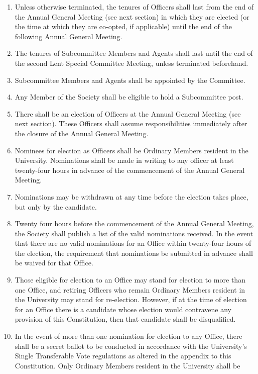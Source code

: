 \documentclass{article}
\begin{document}
\begin{enumerate}
\item Unless otherwise terminated, the tenures of Officers shall last from the
end of the Annual General Meeting (see next section) in which they are
elected (or the time at which they are co-opted, if applicable) until the
end of the following Annual General Meeting.
\item The tenures of Subcommittee Members and Agents shall last until the
end of the second Lent Special Committee Meeting, unless terminated
beforehand.
\item Subcommittee Members and Agents shall be appointed by the Committee.
\item Any Member of the Society shall be eligible to hold a Subcommittee post.
\item There shall be an election of Officers at the Annual General Meeting (see
next section). These Officers shall assume responsibilities immediately
after the closure of the Annual General Meeting.
\item Nominees for election as Officers shall be Ordinary Members resident in
the University. Nominations shall be made in writing to any officer at least twenty-four hours in advance of the commencement of the Annual General Meeting.
\item Nominations may be withdrawn at any time before the election takes
place, but only by the candidate.
\item Twenty four hours before the commencement of the Annual General Meeting, the Society shall publish a list of the valid nominations received. In
the event that there are no valid nominations for an Office within twenty-four hours of the election, the requirement that nominations be submitted
in advance shall be waived for that Office.
\item Those eligible for election to an Office may stand for election to more than
one Office, and retiring Officers who remain Ordinary Members resident in
the University may stand for re-election. However, if at the time of election
for an Office there is a candidate whose election would contravene any
provision of this Constitution, then that candidate shall be disqualified.
\item In the event of more than one nomination for election to any Office, there
shall be a secret ballot to be conducted in accordance with the University's
Single Transferable Vote regulations as altered in the appendix to this
Constitution. Only Ordinary Members resident in the University shall be

\end{enumerate}
\end{document}
